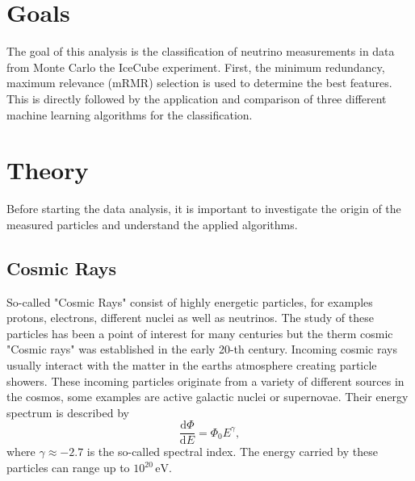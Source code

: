 \section{Goals}
The goal of this analysis is the classification of neutrino measurements in data from Monte Carlo the IceCube experiment. 
First, the minimum redundancy, maximum relevance (mRMR) selection is used to determine the best features.
This is directly followed by the application and comparison of three different machine learning algorithms for the classification.


\section{Theory}
\label{sec:Theory}
Before starting the data analysis, it is important to investigate the origin of the measured particles and understand the applied algorithms. 

\subsection{Cosmic Rays}
So-called "Cosmic Rays" consist of highly energetic particles, for examples protons, electrons, different nuclei as well as neutrinos. 
The study of these particles has been a point of interest for many centuries but the therm cosmic "Cosmic rays" was established in the early 20-th century. 
Incoming cosmic rays usually interact with the matter in the earths atmosphere creating particle showers. 
These incoming particles originate from a variety of different sources in the cosmos, some examples are active galactic nuclei or supernovae.
Their energy spectrum is described by
\begin{equation*}
	\frac{\mathrm{d}\Phi}{\mathrm{d}E} = \Phi_0 E^\gamma,
\end{equation*}
where $\gamma \approx -2.7$ is the so-called spectral index. 
The energy carried by these particles can range up to $10^{20}\,\unit{\eV}$.


